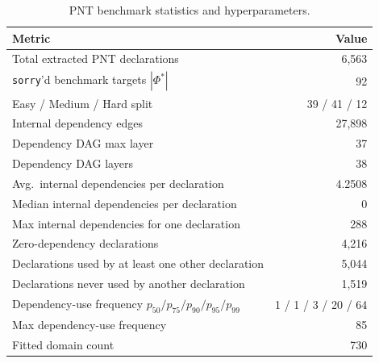 \begin{table}[ht]
\centering
\caption{PNT benchmark statistics and hyperparameters.}
\label{tab:pnt-stats}
\begin{tabular}{lr}
\toprule
\textbf{Metric} & \textbf{Value} \\
\midrule
Total extracted PNT declarations & 6,563 \\
\texttt{sorry}'d benchmark targets $|\Phi^*|$ & 92 \\
Easy / Medium / Hard split & 39 / 41 / 12 \\
Internal dependency edges & 27,898 \\
Dependency DAG max layer & 37 \\
Dependency DAG layers & 38 \\
Avg.\ internal dependencies per declaration & 4.2508 \\
Median internal dependencies per declaration & 0 \\
Max internal dependencies for one declaration & 288 \\
Zero-dependency declarations & 4,216 \\
Declarations used by at least one other declaration & 5,044 \\
Declarations never used by another declaration & 1,519 \\
Dependency-use frequency $p_{50}/p_{75}/p_{90}/p_{95}/p_{99}$ & 1 / 1 / 3 / 20 / 64 \\
Max dependency-use frequency & 85 \\
Fitted domain count & 730 \\

\end{tabular}
\end{table}
